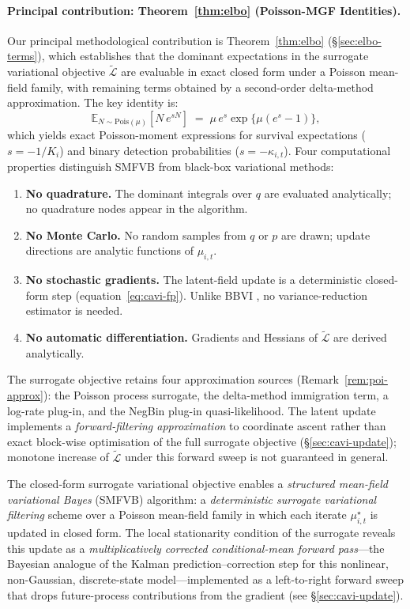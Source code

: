 \documentclass[review,12pt]{elsarticle}
\theoremstyle{definition}
\begin{document}
\paragraph{Principal contribution: Theorem~\ref{thm:elbo} (Poisson-MGF Identities).}
Our principal methodological contribution is Theorem~\ref{thm:elbo}
(\S\ref{sec:elbo-terms}), which establishes that the dominant expectations
in the surrogate variational objective $\tilde{\mathcal{L}}$ are evaluable in
exact closed form under a Poisson mean-field family, with remaining terms
obtained by a second-order delta-method approximation.  The key identity is:
\begin{equation}\label{eq:mgf-key}
\mathbb{E}_{N\sim\mathrm{Pois}(\mu)}\!\left[N\,e^{sN}\right]
\;=\;
\mu\,e^s\exp\!\bigl\{\mu(e^s-1)\bigr\},
\end{equation}
which yields exact Poisson-moment expressions for survival expectations ($s=-1/K_i$)
and binary detection probabilities ($s=-\kappa_{i,t}$).
Four computational properties distinguish SMFVB from black-box variational methods:
\begin{enumerate}[nosep,label=(\alph*)]
\item \textbf{No quadrature.}  The dominant integrals over $q$ are evaluated
  analytically; no quadrature nodes appear in the algorithm.
\item \textbf{No Monte Carlo.}  No random samples from $q$ or $p$ are drawn;
  update directions are analytic functions of $\mu_{i,t}$.
\item \textbf{No stochastic gradients.}  The latent-field update is a
  deterministic closed-form step (equation~\eqref{eq:cavi-fp}).
  Unlike BBVI \citep{ranganath2014}, no variance-reduction estimator is needed.
\item \textbf{No automatic differentiation.}  Gradients and Hessians of
  $\tilde{\mathcal{L}}$ are derived analytically.
\end{enumerate}
The surrogate objective retains four approximation sources
(Remark~\ref{rem:poi-approx}): the Poisson process surrogate, the
delta-method immigration term, a log-rate plug-in, and the NegBin plug-in
quasi-likelihood.  The latent update
implements a \emph{forward-filtering approximation} to coordinate ascent
rather than exact block-wise optimisation of the full surrogate objective
(\S\ref{sec:cavi-update}); monotone increase of $\tilde{\mathcal{L}}$
under this forward sweep is not guaranteed in general.

The closed-form surrogate variational objective enables a \emph{structured mean-field variational Bayes}
(SMFVB) algorithm: a \emph{deterministic surrogate variational filtering} scheme
over a Poisson mean-field family in which each iterate $\mu_{i,t}^\star$ is
updated in closed form.  The local stationarity condition of the surrogate reveals
this update as a \emph{multiplicatively corrected conditional-mean forward pass}---the
Bayesian analogue of the Kalman prediction--correction step for this nonlinear,
non-Gaussian, discrete-state model---implemented as a left-to-right forward sweep
that drops future-process contributions from the gradient
(see \S\ref{sec:cavi-update}).
\end{document}

